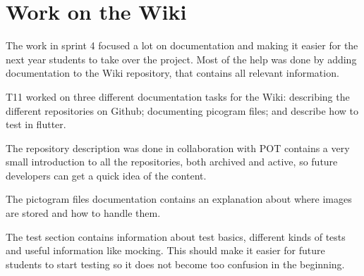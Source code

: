 \section{Work on the Wiki}
The work in sprint 4 focused a lot on documentation and making it easier for the next year students to take over the project. Most of the help was done by adding documentation to the Wiki repository, that contains all relevant information. 

\gls{T11} worked on three different documentation tasks for the Wiki: describing the different repositories on Github; documenting picogram files; and describe how to test in flutter. 

The repository description was done in collaboration with \gls{POT} contains a very small introduction to all the repositories, both archived and active, so future developers can get a quick idea of the content.

The pictogram files documentation contains an explanation about where images are stored and how to handle them.

The test section contains information about test basics, different kinds of tests and useful information like mocking. This should make it easier for future students to start testing so it does not become too confusion in the beginning.

